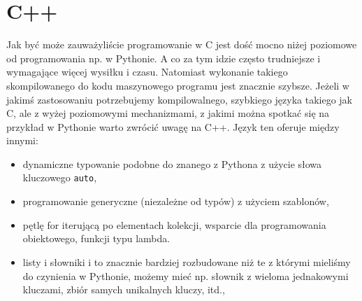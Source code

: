 % 
% 
% 
% 

\section{C++}

Jak być może zauważyliście programowanie w C jest dość mocno niżej poziomowe od programowania np. w Pythonie.
A co za tym idzie często trudniejsze i wymagające więcej wysiłku i czasu.
Natomiast wykonanie takiego skompilowanego do kodu maszynowego programu jest znacznie szybsze.
Jeżeli w jakimś zastosowaniu potrzebujemy kompilowalnego, szybkiego języka takiego jak C,
	ale z wyżej poziomowymi mechanizmami, z jakimi można spotkać się na przykład w Pythonie warto zwrócić uwagę na C++.
Język ten oferuje między innymi:
\begin{itemize}
	\item dynamiczne typowanie podobne do znanego z Pythona z użycie słowa kluczowego \Verb$auto$,
	\item programowanie generyczne (niezależne od typów) z użyciem szablonów,
	\item pętlę for iterującą po elementach kolekcji, wsparcie dla programowania obiektowego, funkcji typu lambda.
	\item listy i słowniki i to znacznie bardziej rozbudowane niż te z którymi mieliśmy do czynienia w Pythonie, 
		możemy mieć np. słownik z wieloma jednakowymi kluczami, zbiór samych unikalnych kluczy, itd.,
\end{itemize}

